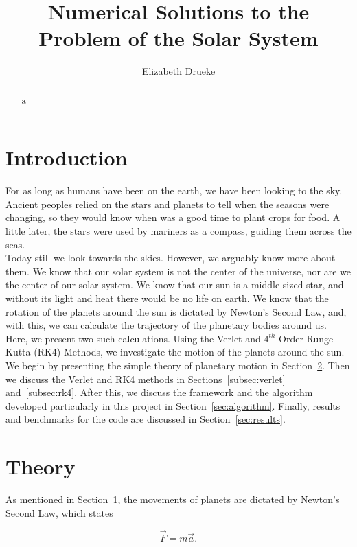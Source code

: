 \documentclass[12pt]{article}
\title{Numerical Solutions to the Problem of the Solar System}
\author{Elizabeth Drueke}
\numberwithin{equation}{section}
\begin{document}
\maketitle

\begin{abstract}


a
\end{abstract}

\section{Introduction}
\label{sec:intro}

For as long as humans have been on the earth, we have been looking to the sky.  Ancient peoples relied on the stars and planets to tell when the seasons were changing, so they would know when was a good time to plant crops for food.  A little later, the stars were used by mariners as a compass, guiding them across the seas.  
\\\indent Today still we look towards the skies.  However, we arguably know more about them.  We know that our solar system is not the center of the universe, nor are we the center of our solar system.  We know that our sun is a middle-sized star, and without its light and heat there would be no life on earth.  We know that the rotation of the planets around the sun is dictated by Newton's Second Law, and, with this, we can calculate the trajectory of the planetary bodies around us.  
\\\indent Here, we present two such calculations.  Using the Verlet and $4^{th}$-Order Runge-Kutta (RK4) Methods, we investigate the motion of the planets around the sun.  We begin by presenting the simple theory of planetary motion in Section~\ref{sec:theory}.  Then we discuss the Verlet and RK4 methods in Sections~\ref{subsec:verlet} and~\ref{subsec:rk4}.  After this, we discuss the framework and the algorithm developed particularly in this project in Section~\ref{sec:algorithm}.  Finally, results and benchmarks for the code are discussed in Section~\ref{sec:results}.

\section{Theory}
\label{sec:theory}

As mentioned in Section~\ref{sec:intro}, the movements of planets are dictated by Newton's Second Law, which states

$$\vec{F} = m\vec{a}.$$
\end{document}
